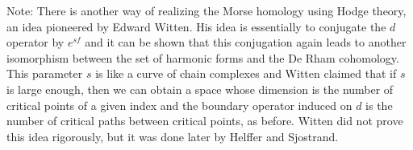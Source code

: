\documentclass[12pt]{article}
\begin{document}
Note: There is another way of realizing the Morse homology using Hodge theory, an idea pioneered by Edward Witten. His idea is essentially to conjugate the $d$ operator by $e^{sf}$ and it can be shown that this conjugation again leads to another isomorphism between the set of harmonic forms and the De Rham cohomology. This parameter $s$ is like a curve of chain complexes and Witten claimed that if $s$ is large enough, then we can obtain a space whose dimension is the number of critical points of a given index and the boundary operator induced on $d$ is the number of critical paths between critical points, as before. Witten did not prove this idea rigorously, but it was done later by Helffer and Sjostrand.
\end{document}
